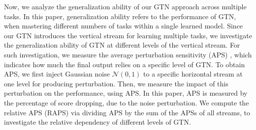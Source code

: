 \documentclass[letterpaper]{article} %
\begin{document}
Now, we analyze the generalization ability of our GTN approach across multiple tasks. In this paper, generalization ability refers to the performance of GTN, when mastering different numbers of tasks within a single learned model.
Since our GTN introduces the vertical stream for learning multiple tasks, we investigate the generalization ability of GTN at different levels of the vertical stream.
For such investigation, we measure the average perturbation sensitivity (APS) \cite{rusu2016progressive}, which indicates how much the final output relies on a specific level of GTN.
To obtain APS, we first inject Gaussian noise $\mathcal{N}(0,1)$ to a specific horizontal stream at one level for producing perturbation.
Then, we measure the impact of this perturbation on the performance, using APS.
In this paper, APS is measured by the percentage of score dropping, due to the noise perturbation. We compute the relative APS (RAPS) via dividing APS by the sum of the APSs of all streams, to investigate the relative dependency of different levels of GTN.
\end{document}
